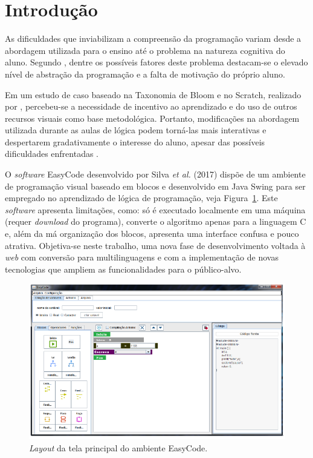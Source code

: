 \documentclass[12pt]{article}
\begin{document}
\section{Introdução} 
As dificuldades que inviabilizam a compreensão da programação variam desde a abordagem utilizada para o ensino até o problema na natureza cognitiva do aluno. Segundo \cite{GOMES:2008}, dentre os possíveis fatores deste problema destacam-se o elevado nível de abstração da programação e a falta de motivação do próprio aluno. 
\par Em um estudo de caso baseado na Taxonomia de Bloom e no Scratch, realizado por \cite{ARAUJO:2013}, percebeu-se a necessidade de incentivo ao aprendizado e do uso de outros recursos visuais como base metodológica. Portanto, modificações na abordagem utilizada durante as aulas de lógica podem torná-las mais interativas e despertarem gradativamente o interesse do aluno, apesar das possíveis dificuldades enfrentadas \cite{SILVA:2017}.
\par O \textit{software} EasyCode desenvolvido por Silva \textit{et al.} (2017) dispõe de um ambiente de programação visual baseado em blocos e desenvolvido em Java Swing para ser empregado no aprendizado de lógica de programação, veja Figura~\ref{fig1}. Este \textit{software} apresenta limitações, como: só é executado localmente em uma máquina (requer \textit{download} do programa), converte o algoritmo apenas para a linguagem C e, além da má organização dos blocos, apresenta uma interface confusa e pouco atrativa. Objetiva-se neste trabalho, uma nova fase de desenvolvimento voltada à \textit{web} com conversão para multilinguagens e com a implementação de novas tecnologias que ampliem as funcionalidades para o público-alvo.
	\begin{figure}[h]
		\centering
		\includegraphics[scale=0.5]{2017.png}
		\caption{\textit{Layout} da tela principal do ambiente EasyCode.}
		\label{fig1}
	\end{figure}
\end{document}
